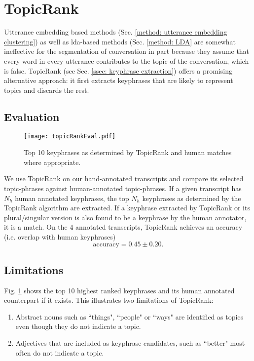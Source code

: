 \section{TopicRank \label{method: topic rank}}

Utterance \gls{embedding} based methods (Sec. \ref{method: utterance embedding clustering}) as well as \gls{lda}-based methods (Sec. \ref{method: LDA} are somewhat ineffective for the segmentation of conversation in part because they assume that every word in every \gls{utterance} contributes to the topic of the conversation, which is false.
TopicRank\cite{bougouin-etal-2013-topicrank} (see Sec. \ref{ssec: keyphrase extraction}) offers a promising alternative approach: it first extracts \glspl{keyphrase} that are likely to represent topics and discards the rest.

\subsection{Evaluation}
\begin{figure}
    \centering
    \texttt{[image: topicRankEval.pdf]}
    \caption{Top 10 \glspl{keyphrase} as determined by TopicRank and human matches where appropriate.}
    \label{fig: topicrank eval}
\end{figure}
We use TopicRank on our hand-annotated transcripts and compare its selected topic-phrases against human-annotated topic-phrases. If a given transcript has $N_{h}$ human annotated \glspl{keyphrase}, the top $N_{h}$ \glspl{keyphrase} as determined by the TopicRank algorithm are extracted. If a \gls{keyphrase} extracted by TopicRank or its plural/singular version is also found to be a \gls{keyphrase} by the human annotator, it is a match. On the 4 annotated transcripts, TopicRank achieves an accuracy (i.e. overlap with human \glspl{keyphrase})
\begin{equation}
    \text{accuracy} = 0.45 \pm 0.20.
    \label{eq: topic rank accuracy}
\end{equation}

\subsection{Limitations}
Fig. \ref{fig: topicrank eval} shows the top 10 highest ranked \glspl{keyphrase} and its human annotated counterpart if it exists. This illustrates two limitations of TopicRank:
\begin{enumerate}
    \item Abstract nouns such as ``things", ``people" or ``ways" are identified as topics even though they do not indicate a topic.
    \item Adjectives that are included as \gls{keyphrase} candidates, such as ``better" most often do not indicate a topic.
\end{enumerate}

